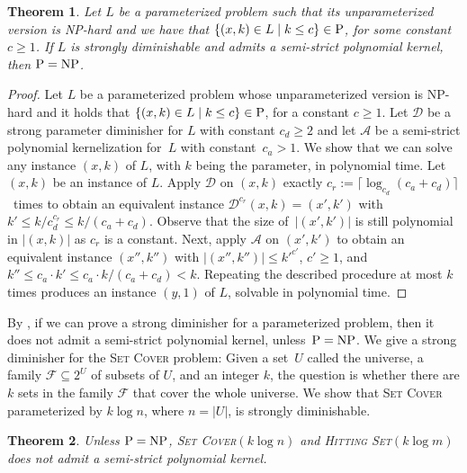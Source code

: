 \documentclass[11pt,a4,USenglish]{article}
\newcommand{\prob}[1]{\textsc{#1}}
\newcommand{\pprob}[2]{\prob{#1}$(#2)$}
\newcommand{\NP}{\textnormal{NP}}
\newcommand{\PTIME}{\textnormal{P}}
\newcommand{\PeqNP}{$\PTIME{}=\NP{}$}
\theoremstyle{definition}
\theoremstyle{plain}
\newtheorem{thm}{Theorem}
\theoremstyle{remark}
\newcommand{\calD}{\mathcal{D}}
\newcommand{\calA}{\mathcal{A}}
\begin{document}
\begin{thm}
\label{thm:strongdiminisher}%
Let $L$ be a parameterized problem such that its unparameterized version is \NP{}-hard and we have that $\{(x,k)\in L\mid k\le c\}\in \PTIME{}$, for some constant $c\geq 1$. %
If $L$ is strongly diminishable and admits a semi-strict polynomial kernel, then \PeqNP{}.
\end{thm}
%
\begin{proof}
 Let $L$ be a parameterized problem whose unparameterized version is \NP{}-hard and it holds that $\{(x,k)\in L\mid k\le c\}\in \PTIME{}$, for a constant $c\geq 1$. 
%
 Let $\calD$ be a strong parameter diminisher for $L$ with constant $c_d\geq 2$ and let $\calA$ be a semi-strict polynomial kernelization for~$L$ with constant~$c_a>1$.
 \iflong{}We show that we can solve any instance $(x,k)$ of $L$, with $k$ being the parameter, in polynomial time. \fi{}%
 Let $(x,k)$ be an instance of $L$.
 Apply $\calD$ on $(x,k)$ exactly $c_r:=\lceil\log_{c_d}(c_a+c_d)\rceil$~times to obtain an equivalent instance $\calD^{c_r}(x,k)=(x',k')$ with $k'\leq k/c_d^{c_r}\leq k/(c_a+c_d)$.
 Observe that the size of~$|(x', k')|$ is still polynomial in $|(x, k)|$ as $c_r$ is a constant.
 Next, apply $\calA$ on $(x',k')$ to obtain an equivalent instance $(x'',k'')$ with $|(x'', k'')|\leq k'^{c'}$, $c'\geq 1$, and $k''\leq c_a\cdot k'\leq c_a\cdot k/(c_a+c_d)<k$.
 Repeating the described procedure at most $k$ times produces an instance $(y,1)$ of $L$, solvable in polynomial time. 
\end{proof}
%
By , if we can prove a strong diminisher for a parameterized problem, then it does not admit a semi-strict polynomial kernel, unless~\PeqNP{}.
We give a strong diminisher for the \prob{Set Cover} problem: Given a set~$U$ called the universe, a family $\mathcal{F}\subseteq 2^U$ of subsets of $U$, and an integer $k$, the question is whether there are $k$ sets in the family $\mathcal{F}$ that cover the whole universe.
%
We show that \prob{Set Cover} parameterized by $k\log n$, where $n=|U|$, is strongly diminishable. 

\begin{thm}
 Unless \PeqNP{}, \pprob{Set Cover}{k \log n} and \pprob{Hitting Set}{k \log m} does not admit a semi-strict polynomial kernel.
\end{thm}
\end{document}
